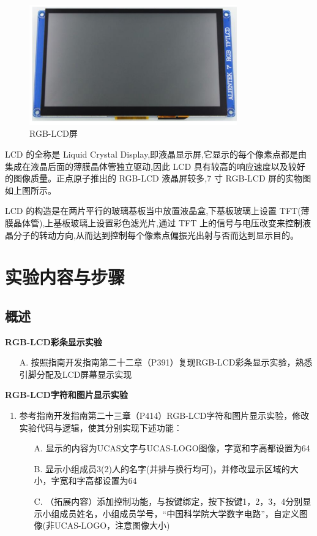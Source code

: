 \documentclass[UTF8]{article}
\theoremstyle{MyLineTheoremStyle} %
\theoremstyle{MyBlockTheoremStyle} %
\theoremstyle{MySubsubsectionStyle} %
\begin{document}
\begin{figure}[H]
    \centering
    \includegraphics[width=0.8\textwidth]{LCD.png}
    \caption{RGB-LCD屏}
    \label{fig:RGB-LCD屏}
\end{figure}

LCD 的全称是 Liquid Crystal Display,即液晶显示屏,它显示的每个像素点都是由集成在液晶后面的薄膜晶体管独立驱动,因此 LCD 具有较高的响应速度以及较好的图像质量。正点原子推出的 RGB-LCD 液晶屏较多,7 寸 RGB-LCD 屏的实物图如上图所示。

LCD 的构造是在两片平行的玻璃基板当中放置液晶盒,下基板玻璃上设置 TFT(薄膜晶体管),上基板玻璃上设置彩色滤光片,通过 TFT 上的信号与电压改变来控制液晶分子的转动方向,从而达到控制每个像素点偏振光出射与否而达到显示目的。


\newpage
\section{实验内容与步骤}
\subsection{概述}
\textbf{RGB-LCD彩条显示实验}
\begin{enumerate}
\item[A.] 按照指南开发指南第二十二章（P391）复现RGB-LCD彩条显示实验，熟悉引脚分配及LCD屏幕显示实现
\end{enumerate}

\textbf{RGB-LCD字符和图片显示实验}
\begin{enumerate}
    \item 参考指南开发指南第二十三章（P414）RGB-LCD字符和图片显示实验，修改实验代码与逻辑，使其分别实现下述功能：
    \begin{itemize}
        \item[A.] 显示的内容为UCAS文字与UCAS-LOGO图像，字宽和字高都设置为64
        \item[B.] 显示小组成员3(2)人的名字(并排与换行均可)，并修改显示区域的大小，字宽和字高都设置为64
        \item[C.] （拓展内容）添加控制功能，与按键绑定，按下按键1，2，3，4分别显示小组成员姓名，小组成员学号，“中国科学院大学数字电路”，自定义图像(非UCAS-LOGO，注意图像大小)
    \end{itemize}
\end{enumerate}
\end{document}

